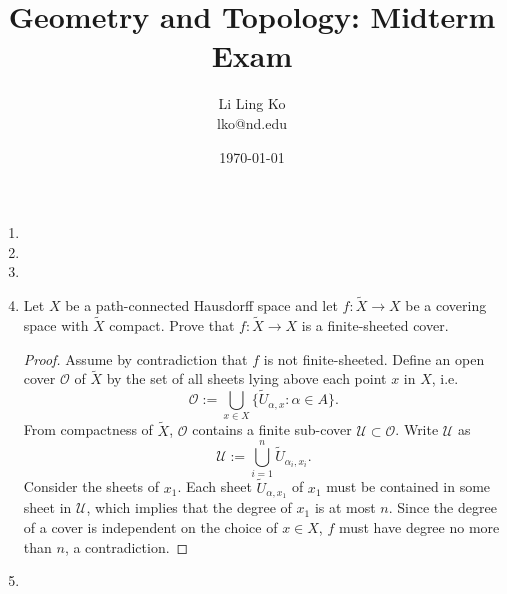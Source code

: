 \documentclass{article}
\begin{document}
\title{Geometry and Topology: Midterm Exam}
\author{Li Ling Ko\\ lko@nd.edu}
\date{\today}
\maketitle

\begin{enumerate}[label={\bf Q\arabic*:}]
  \item

  \item

  \item

  \item Let $X$ be a path-connected Hausdorff space and let
    $f:\widetilde{X}\rightarrow X$ be a covering space with $\widetilde{X}$
    compact. Prove that $f:\widetilde{X}\rightarrow X$  is a
    finite-sheeted cover.

    \begin{proof}
      Assume by contradiction that $f$ is not finite-sheeted. Define an
      open cover $\mathcal{O}$ of $\widetilde{X}$ by the set of all sheets
      lying above each point $x$ in $X$, i.e.
      \begin{equation*}
        \mathcal{O} := \bigcup_{x\in X}
          \{\widetilde{U}_{\alpha,x}:\alpha\in A\}.
      \end{equation*}
      From compactness of $\widetilde{X}$, $\mathcal{O}$ contains a finite
      sub-cover $\mathcal{U}\subset\mathcal{O}$. Write $\mathcal{U}$ as
      \begin{equation*}
        \mathcal{U} := \bigcup_{i=1}^n \widetilde{U}_{\alpha_i,x_i}.
      \end{equation*}
      Consider the sheets of $x_1$. Each sheet $\widetilde{U}_{\alpha,x_1}$
      of $x_1$ must be contained in some sheet in $\mathcal{U}$, which
      implies that the degree of $x_1$ is at most $n$. Since the degree of
      a cover is independent on the choice of $x\in X$, $f$ must have
      degree no more than $n$, a contradiction.
    \end{proof}

  \item
\end{enumerate}
\end{document}
